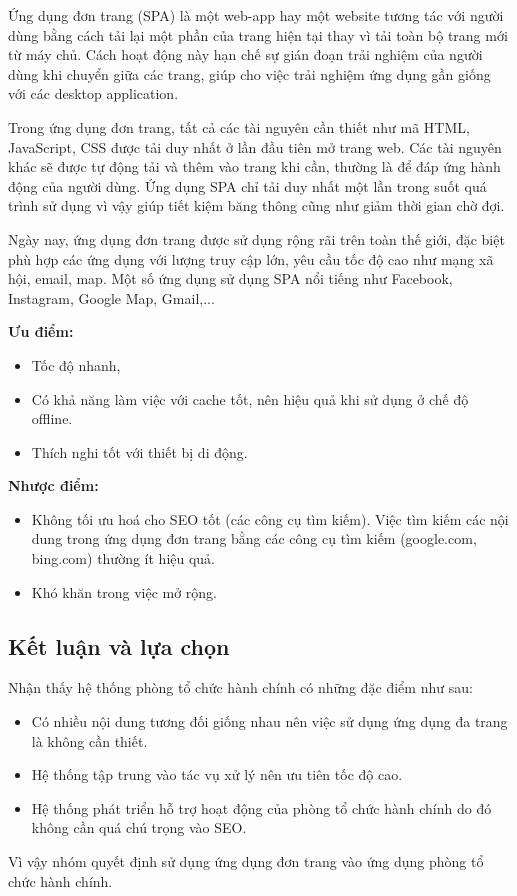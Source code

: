 Ứng dụng đơn trang (SPA) là một web-app hay một website tương tác với người dùng bằng cách tải lại một phần của trang hiện tại thay vì tải toàn bộ trang mới từ máy chủ. Cách hoạt động này hạn chế sự gián đoạn trải nghiệm của người dùng khi chuyển giữa các trang, giúp cho việc trải nghiệm ứng dụng gần giống với các desktop application.

Trong ứng dụng đơn trang, tất cả các tài nguyên cần thiết như mã HTML, JavaScript, CSS được tải duy nhất ở lần đầu tiên mở trang web. Các tài nguyên khác sẽ được tự động tải và thêm vào trang khi cần, thường là để đáp ứng hành động của người dùng. Ứng dụng SPA chỉ tải duy nhất một lần trong suốt quá trình sử dụng vì vậy giúp tiết kiệm băng thông cũng như giảm thời gian chờ đợi.

Ngày nay, ứng dụng đơn trang được sử dụng rộng rãi trên toàn thế giới, đặc biệt phù hợp các ứng dụng với lượng truy cập lớn, yêu cầu tốc độ cao như mạng xã hội, email, map. Một số ứng dụng sử dụng SPA nổi tiếng như Facebook, Instagram, Google Map, Gmail,...

\textbf{Ưu điểm:}
\begin{itemize}
    \item Tốc độ nhanh,
    \item Có khả năng làm việc với cache tốt, nên hiệu quả khi sử dụng ở chế độ offline.
    \item Thích nghi tốt với thiết bị di động.
\end{itemize}

\textbf{Nhược điểm:}

\begin {itemize}
    \item Không tối ưu hoá cho SEO tốt (các công cụ tìm kiếm). Việc tìm kiếm các nội dung trong ứng dụng đơn trang bằng các công cụ tìm kiếm (google.com, bing.com) thường ít hiệu quả.
    \item Khó khăn trong việc mở rộng.
\end {itemize}
\subsection{Kết luận và lựa chọn}
Nhận thấy hệ thống phòng tổ chức hành chính có những đặc điểm như sau:
\begin {itemize}
    \item Có nhiều nội dung tương đối giống nhau nên việc sử dụng ứng dụng đa trang là không cần thiết.
    \item Hệ thống tập trung vào tác vụ xử lý nên ưu tiên tốc độ cao.
    \item Hệ thống phát triển hỗ trợ hoạt động của phòng tổ chức hành chính do đó không cần quá chú trọng vào SEO.
\end {itemize}

Vì vậy nhóm quyết định sử dụng ứng dụng đơn trang vào ứng dụng phòng tổ chức hành chính.




